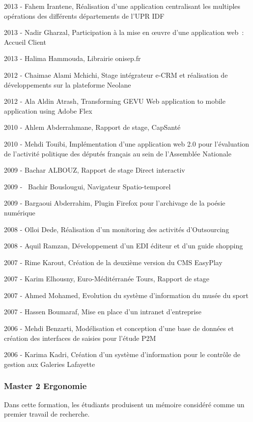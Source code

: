 \documentclass[
  a4paper,
  DIV=11,
  numbers=noendperiod]{scrreprt}
\begin{document}
2013 - Fahem Irantene, Réalisation d'une application centralisant les
multiples opérations des différents départements de l'UPR IDF

2013 - Nadir Gharzal, Participation à la mise en œuvre d'une application
web~: Accueil Client

2013 - Halima Hammouda, Librairie onisep.fr

2012 - Chaimae Alami Mchichi, Stage intégrateur e-CRM et réalisation de
développements sur la plateforme Neolane

2012 - Ala Aldin Atrash, Transforming GEVU Web application to mobile
application using Adobe Flex

2010 - Ahlem Abderrahmane, Rapport de stage, CapSanté

2010 - Mehdi Touibi, Implémentation d'une application web 2.0 pour
l'évaluation de l'activité politique des députés français au sein de
l'Assemblée Nationale

2009 - Bachar ALBOUZ, Rapport de stage Direct interactiv

2009 -~ Bachir Bouslougui, Navigateur Spatio-temporel

2009 - Bargaoui Abderrahim, Plugin Firefox pour l'archivage de la poésie
numérique

2008 - Olloi Dede, Réalisation d'un monitoring des activités
d'Outsourcing

2008 - Aquil Ramzan, Développement d'un EDI éditeur et d'un guide
shopping

2007 - Rime Karout, Création de la deuxième version du CMS EasyPlay

2007 - Karim Elhousny, Euro-Méditérranée Tours, Rapport de stage

2007 - Ahmed Mohamed, Evolution du système d'information du musée du
sport

2007 - Hassen Boumaraf, Mise en place d'un intranet d'entreprise

2006 - Mehdi Benzarti, Modélisation et conception d'une base de données
et création des interfaces de saisies pour l'étude P2M

2006 - Karima Kadri, Création d'un système d'information pour le
contrôle de gestion aux Galeries Lafayette

\subsubsection{Master 2 Ergonomie}\label{master-2-ergonomie}

Dans cette formation, les étudiants produisent un mémoire considéré
comme un premier travail de recherche.
\end{document}

